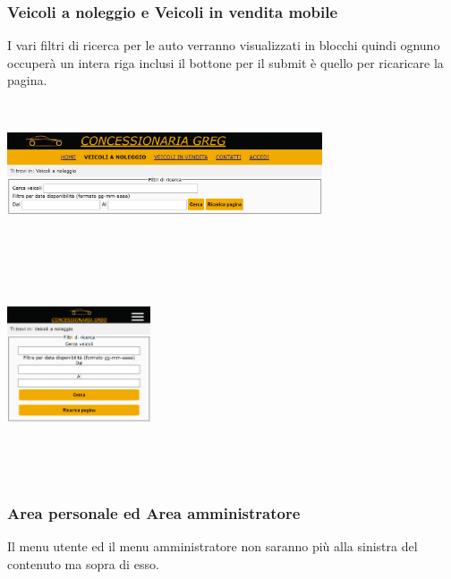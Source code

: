         \subsubsection{Veicoli a noleggio e Veicoli in vendita mobile}
        I vari filtri di ricerca per le auto verranno visualizzati in blocchi quindi ognuno occuperà un intera riga inclusi il bottone per il submit è quello per ricaricare la pagina.
        
        \begin{center}
            \includegraphics[width=22pc, height=10pc]{./img/VeicoliNoleggioDesktop.png} \includegraphics[width=10pc, height=16pc]{./img/VeicoliNoleggioMobile.png}
        \end{center}

        \subsubsection{Area personale ed Area amministratore}
        Il menu utente ed il menu amministratore non saranno più alla sinistra del contenuto ma sopra di esso.

